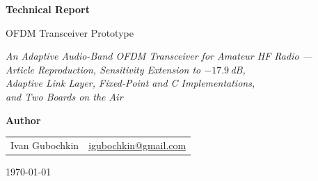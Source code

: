 \documentclass[12pt,a4paper]{article}
\begin{document}
\begin{titlepage}
    \centering
    \vspace*{2cm}

    {\Huge\bfseries Technical Report\par}
    \vspace{0.5cm}
    {\large OFDM Transceiver Prototype\par}
    \vspace{1cm}
    {\Large\itshape An Adaptive Audio-Band OFDM Transceiver for Amateur
    HF Radio ---\\
    Article Reproduction, Sensitivity Extension to $-17.9$\,dB,\\
    Adaptive Link Layer, Fixed-Point and C Implementations,\\
    and Two Boards on the Air\par}

    \vspace{2cm}

    {\large\bfseries Author\par}
    \vspace{0.5cm}
    \begin{tabular}{ll}
        Ivan Gubochkin & \href{mailto:igubochkin@gmail.com}{igubochkin@gmail.com} \\
    \end{tabular}

    \vfill

    {\large \today\par}
\end{titlepage}
\end{document}
